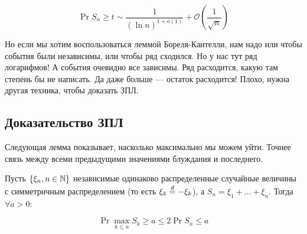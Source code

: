 \[
  \Pr{S_n \geq t} \sim \frac{1}{(\ln n)^{1 + o(1)}} + \mathcal{O}\left(\frac{1}{\sqrt{n}}\right)
\]

Но если мы хотим воспользоваться леммой Бореля-Кантелли, нам надо или чтобы
события были независимы, или чтобы ряд сходился. Но у нас тут ряд логарифмов! А события
очевидно все зависимы.
Ряд расходится, какую там степень бы не написать. Да даже больше --- остаток расходится!
Плохо, нужна другая техника, чтобы доказать ЗПЛ.

\subsection{Доказательство ЗПЛ}

Следующая лемма показывает, насколько максимально мы можем уйти. Точнее связь
между всеми предыдущими значениями блуждания и последнего.

\begin{theorem}
  Пусть $\{\xi_n, n \in \mathbb{N}\}$ независимые одинаково распределенные случайные
  величины с симметричным распределением (то есть $\xi_k \overset{d}{=} -\xi_k$), а
  $S_n = \xi_1 + \ldots + \xi_n$. Тогда $\forall a > 0$:

  \[
    \Pr{\max\limits_{k \leq n} S_k \geq a} \leq 2\Pr{S_n \leq a}
  \]
\end{theorem}

